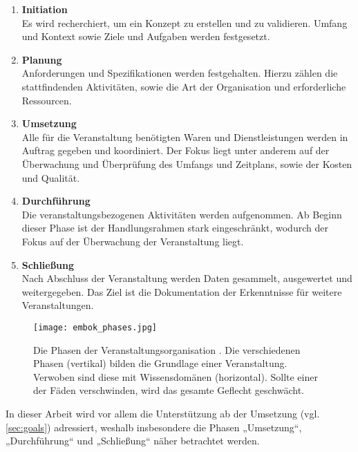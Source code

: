 \begin{enumerate}
    \setlength{\itemsep}{1em}
    \item \textbf{Initiation} \\
          Es wird recherchiert, um ein Konzept zu erstellen und zu validieren.
          Umfang und Kontext sowie Ziele und Aufgaben werden festgesetzt.
    \item \textbf{Planung} \\
          Anforderungen und Spezifikationen werden festgehalten. Hierzu zählen
          die stattfindenden Aktivitäten, sowie die Art der Organisation und
          erforderliche Ressourcen.
    \item \textbf{Umsetzung} \\
          Alle für die Veranstaltung benötigten Waren und Dienstleistungen
          werden in Auftrag gegeben und koordiniert. Der Fokus liegt unter
          anderem auf der Überwachung und Überprüfung des Umfangs und Zeitplans,
          sowie der Kosten und Qualität.
    \item \textbf{Durchführung} \\
          Die veranstaltungsbezogenen Aktivitäten werden aufgenommen. Ab Beginn
          dieser Phase ist der Handlungsrahmen stark eingeschränkt, wodurch der
          Fokus auf der Überwachung der Veranstaltung liegt.
    \item \textbf{Schließung} \\
          Nach Abschluss der Veranstaltung werden Daten gesammelt, ausgewertet
          und weitergegeben. Das Ziel ist die Dokumentation der Erkenntnisse für
          weitere Veranstaltungen.
\end{enumerate}

\begin{figure}[htpb]
    \centering
    \texttt{[image: embok\_phases.jpg]}
    \caption{Die Phasen der Veranstaltungsorganisation \cite{Silvers2013b}. Die
        verschiedenen Phasen (vertikal) bilden die Grundlage einer
        Veranstaltung. Verwoben sind diese mit Wissensdomänen (horizontal).
        Sollte einer der Fäden verschwinden, wird das gesamte Geflecht
        geschwächt.}
    \label{fig:embok-phases}
\end{figure}

In dieser Arbeit wird vor allem die Unterstützung ab der Umsetzung (vgl.
\autoref{sec:goals}) adressiert, weshalb insbesondere die Phasen „Umsetzung“,
„Durchführung“ und „Schließung“ näher betrachtet werden.

